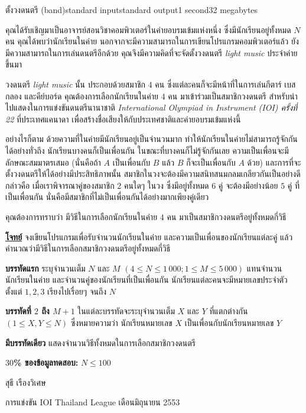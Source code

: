 \documentclass[11pt,a4paper]{article}
\begin{document}
\begin{problem}{ตั้งวงดนตรี (band)}{standard input}{standard output}{1 second}{32 megabytes}

คุณได้รับเชิญมาเป็นอาจารย์สอนวิชาคอมพิวเตอร์ในค่ายอบรมเข้มแห่งหนึ่ง ซึ่งมีนักเรียนอยู่ทั้งหมด $N$ คน คุณได้พบว่านักเรียนในค่าย นอกจากจะมีความสามารถในการเขียนโปรแกรมคอมพิวเตอร์แล้ว ยังมีความสามารถในการเล่นดนตรีอีกด้วย คุณจึงมีความคิดที่จะจัดตั้งวงดนตรี \textit{light music} ประจำค่ายขึ้นมา

วงดนตรี \textit{light music} นั้น ประกอบด้วยสมาชิก $4$ คน ซึ่งแต่ละคนก็จะมีหน้าที่ในการเล่นกีตาร์ เบส กลอง และคีย์บอร์ด คุณต้องการเลือกนักเรียนในค่าย $4$ คน มาเข้าร่วมเป็นสมาชิกวงดนตรี สำหรับนำไปแสดงในการแข่งขันดนตรีนานาชาติ \textit{International Olympiad in Instrument (IOI) ครั้งที่ 22} ที่ประเทศแคนาดา เพื่อสร้างชื่อเสียงให้กับประเทศชาติและค่ายอบรมเข้มแห่งนี้

อย่างไรก็ตาม ด้วยความที่ในค่ายมีนักเรียนอยู่เป็นจำนวนมาก ทำให้นักเรียนในค่ายไม่สามารถรู้จักกันได้อย่างทั่วถึง นักเรียนบางคนก็เป็นเพื่อนกัน ในขณะที่บางคนก็ไม่รู้จักกันเลย ความเป็นเพื่อนจะมีลักษณะสมมาตรเสมอ (นั่นคือถ้า $A$ เป็นเพื่อนกับ $B$ แล้ว $B$ ก็จะเป็นเพื่อนกับ $A$ ด้วย) และการที่จะตั้งวงดนตรีให้ได้อย่างมีประสิทธิภาพนั้น สมาชิกในวงจะต้องมีความสนิทสนมกลมเกลียวกันเป็นอย่างดี กล่าวคือ เมื่อเราพิจารณาคู่ของสมาชิก $2$ คนใดๆ ในวง ซึ่งมีอยู่ทั้งหมด $6$ คู่ จะต้องมีอย่างน้อย $5$ คู่ ที่เป็นเพื่อนกัน นั่นคือมีสมาชิกที่ไม่เป็นเพื่อนกันได้อย่างมากเพียงคู่เดียว

คุณต้องการทราบว่า มีวิธีในการเลือกนักเรียนในค่าย $4$ คน มาเป็นสมาชิกวงดนตรีอยู่ทั้งหมดกี่วิธี

\bigskip
\underline{\textbf{โจทย์}}  จงเขียนโปรแกรมเพื่อรับจำนวนนักเรียนในค่าย และความเป็นเพื่อนของนักเรียนแต่ละคู่ แล้วคำนวณว่ามีวิธีในการเลือกสมาชิกวงดนตรีอยู่ทั้งหมดกี่วิธี


\InputFile

\textbf{บรรทัดแรก} ระบุจำนวนเต็ม $N$ และ $M$ $(4 \leq N \leq 1\,000; 1 \leq M \leq 5\,000)$ แทนจำนวนนักเรียนในค่าย และจำนวนคู่ของนักเรียนที่เป็นเพื่อนกัน นักเรียนแต่ละคนจะมีหมายเลขประจำตัวตั้งแต่ $1, 2, 3$ เรียงไปเรื่อยๆ จนถึง $N$

\textbf{บรรทัดที่ $2$ ถึง $M+1$} ในแต่ละบรรทัดจะระบุจำนวนเต็ม $X$ และ $Y$ ที่แตกต่างกัน $(1 \leq X,Y \leq N) $ ซึ่งหมายความว่า นักเรียนหมายเลข $X$ เป็นเพื่อนกับนักเรียนหมายเลข $Y$



\OutputFile

\textbf{มีบรรทัดเดียว} แสดงจำนวนวิธีทั้งหมดในการเลือกสมาชิกวงดนตรี

\Examples

\begin{example}
%
%
\end{example}

\Scoring

\textbf{$30$\% ของข้อมูลทดสอบ:} $N \leq 100$

\Source

สุธี เรืองวิเศษ

การแข่งขัน IOI Thailand League เดือนมิถุนายน 2553


\end{problem}
\end{document}
